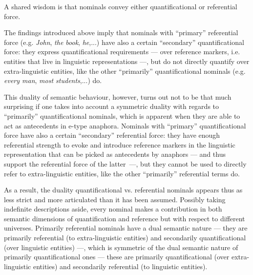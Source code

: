 \documentclass[output=paper
,modfonts
,nonflat]{langsci/langscibook}
\begin{document}
A shared wisdom is that nominals convey either quantificational or referential
force. 

The findings introduced above imply that nominals with ``primary'' referential force 
(e.g. {\em John}, {\em the book}, {\em he},...) have also a certain ``secondary'' quantificational force: 
they express quantificational requirements --- over reference markers, i.e. entities that live in linguistic 
representations ---, but do not directly  quantify  over  extra-linguistic  
entities,  like  the  other  ``primarily'' quantificational nominals 
(e.g. {\em every man}, {\em most students},...) do.

This  duality  of  semantic  behaviour,  however,  turns  out  not  to  be  that  much
surprising  if  one  takes into account  a  symmetric  duality  with  regards  to  ``primarily'' quantificational
nominals, which is apparent when they are able to act as antecedents in e-type anaphora. 
Nominals  with  ``primary''  quantificational 
force have also a certain ``secondary'' referential force: they
have enough referential strength to evoke and introduce reference markers in the
linguistic representation that can be picked as antecedents by anaphors --- and
thus support the referential force of the latter~---, but they cannot be used to directly refer 
to extra-linguistic entities, like the other ``primarily'' referential terms do.

As a result, the duality quantificational vs. referential nominals appears thus as less strict and more articulated 
than it has been assumed. Possibly
taking indefinite descriptions aside, every nominal makes a contribution in both semantic  dimensions  
of  quantification  and  reference  but  with  respect  to  different
universes. Primarily referential nominals have a dual semantic nature --- they are
primarily referential (to extra-linguistic entities) and secondarily quantificational 
(over linguistic entities) ---, which is symmetric of
the  dual semantic  nature  of  primarily  quantificational  ones --- these  are  primarily
quantificational (over extra-linguistic entities) and secondarily referential (to linguistic
entities).
\end{document}
